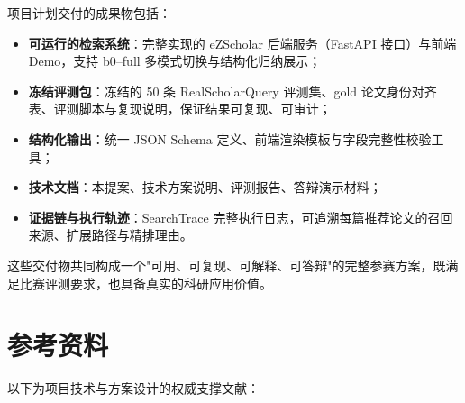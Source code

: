 \documentclass[11pt,a4paper,fontset=macnew]{ctexart}
\begin{document}
项目计划交付的成果物包括：

\begin{itemize}
  \item \textbf{可运行的检索系统}：完整实现的 eZScholar 后端服务（FastAPI 接口）与前端 Demo，支持 b0--full 多模式切换与结构化归纳展示；
  \item \textbf{冻结评测包}：冻结的 50 条 RealScholarQuery 评测集、gold 论文身份对齐表、评测脚本与复现说明，保证结果可复现、可审计；
  \item \textbf{结构化输出}：统一 JSON Schema 定义、前端渲染模板与字段完整性校验工具；
  \item \textbf{技术文档}：本提案、技术方案说明、评测报告、答辩演示材料；
  \item \textbf{证据链与执行轨迹}：SearchTrace 完整执行日志，可追溯每篇推荐论文的召回来源、扩展路径与精排理由。
\end{itemize}

这些交付物共同构成一个"可用、可复现、可解释、可答辩"的完整参赛方案，既满足比赛评测要求，也具备真实的科研应用价值。

\section{参考资料}
\label{sec:references}

以下为项目技术与方案设计的权威支撑文献：
\end{document}
